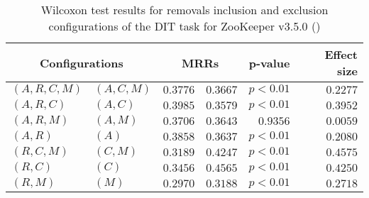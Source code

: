 
\begin{table}
\begin{spacing}{1.2}
\centering
\caption{Wilcoxon test results for removals inclusion and exclusion configurations of the DIT task for ZooKeeper v3.5.0 (\ctwo)}
\label{table:versus-wilcox-zookeeper-dit-removals}
\begin{tabular}{ll|rr|rr}
\toprule
      \multicolumn{2}{c|}{Configurations} &                \multicolumn{2}{c|}{MRRs} &             p-value & Effect size \\
\midrule
 $(A,R,C,M)$ &  $(A,C,M)$ &  $\bm{0.3776}$ &       $0.3667$ & $p<0.01$ &    $0.2277$ \\
   $(A,R,C)$ &    $(A,C)$ &  $\bm{0.3985}$ &       $0.3579$ & $p<0.01$ &    $0.3952$ \\
   $(A,R,M)$ &    $(A,M)$ &  $\bm{0.3706}$ &       $0.3643$ & $0.9356$ &    $0.0059$ \\
     $(A,R)$ &      $(A)$ &  $\bm{0.3858}$ &       $0.3637$ & $p<0.01$ &    $0.2080$ \\
   $(R,C,M)$ &    $(C,M)$ &       $0.3189$ &  $\bm{0.4247}$ & $p<0.01$ &    $0.4575$ \\
     $(R,C)$ &      $(C)$ &       $0.3456$ &  $\bm{0.4565}$ & $p<0.01$ &    $0.4250$ \\
     $(R,M)$ &      $(M)$ &       $0.2970$ &  $\bm{0.3188}$ & $p<0.01$ &    $0.2718$ \\
\bottomrule
\end{tabular}

\end{spacing}
\end{table}

